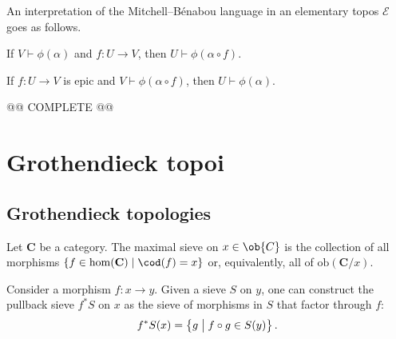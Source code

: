     An interpretation of the Mitchell--B\'enabou language in an elementary topos $\mathcal{E}$ goes as follows.

    \begin{property}[Monotonicity]
        If $V\vdash\phi(\alpha)$ and $f:U\rightarrow V$, then $U\vdash\phi(\alpha\circ f)$.
    \end{property}
    \begin{property}[Locality]
        If $f:U\rightarrow V$ is epic and $V\vdash\phi(\alpha\circ f)$, then $U\vdash\phi(\alpha)$.
    \end{property}

    @@ COMPLETE @@

\section{Grothendieck topoi}\label{section:grothendieck_topos}
\subsection{Grothendieck topologies}


    \begin{example}
        Let $\mathbf{C}$ be a category. The maximal sieve on $x\in\ob{C}$ is the collection of all morphisms $\{f\in\mathrm{hom}(\mathbf{C})\mid\cod(f)=x\}$ or, equivalently, all of $\mathrm{ob}(\mathbf{C}/x)$.
    \end{example}
    \begin{example}
        Consider a morphism $f:x\rightarrow y$. Given a sieve $S$ on $y$, one can construct the pullback sieve $f^*S$ on $x$ as the sieve of morphisms in $S$ that factor through $f$:
        \begin{gather}
            f^*S(x) = \bigl\{g\bigm\vert f\circ g\in S(y)\bigr\}\,.
        \end{gather}
    \end{example}

